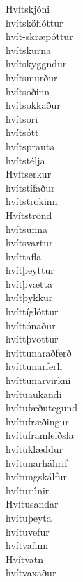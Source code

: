 \documentclass[../samsetningasafn.tex]{subfiles}
\begin{document}
\begin{bigwordlist}
\begin{footnotesize}
\begin{multicols}{4}
\begin{description}
		\item [Hvítskjóni]
		\item [hvítsköflóttur]
		\item [hvít-skræpóttur]	
		\item [hvítskurna]
		\item [hvítskyggndur]
		\item [hvítsmurður]
		\item [hvítsoðinn]
		\item [hvítsokkaður]
		\item [hvítsori]
		\item [hvítsótt]
		\item [hvítsprauta]
		\item [hvítstélja]
		\item [Hvítserkur]
		\item [hvítstífaður]
		\item [hvítstrokinn]
		\item [Hvítströnd]
		\item [hvítsunna]
		\item [hvítsvartur]
		\item [hvíttafla]
		\item [hvítþeyttur]
		\item [hvítþvætta]
		\item [hvítþykkur]
		\item [hvíttíglóttur]
		\item [hvíttónaður]
		\item [hvíttþvottur]
		\item [hvíttunaraðferð]
		\item [hvíttunarferli]
		\item [hvíttunarvirkni]
		\item [hvítuaukandi]
		\item [hvítufæðutegund]
		\item [hvítufræðingur]
		\item [hvítuframleiðsla]
		\item [hvítuklæddur]	
		\item [hvítunarháhrif]
		\item [hvítungskálfur]
		\item [hvíturúnir]
		\item [Hvítusandar]
		\item [hvítuþeyta]
		\item [hvítuvefur]
		\item [hvítvafinn]
		\item [Hvítvatn]
		\item [hvítvaxaður]

\end{description}
\end{multicols}
\end{footnotesize}
\end{bigwordlist}
\end{document}
